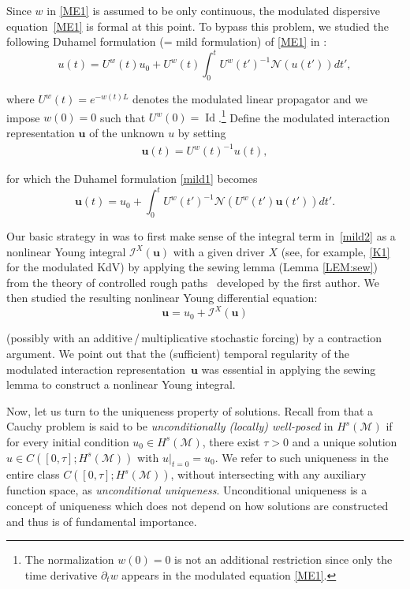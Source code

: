 \documentclass[letterpaper, 11pt,  reqno]{amsart}
\DeclareMathOperator{\Id}{Id}
\newcommand{\1}{\hspace{0.5mm}\text{I}\hspace{0.5mm}}
\newcommand{\I}{\mathcal{I}}
\newcommand{\noi}{\noindent}
\newcommand{\dt}{\partial_t}
\newcommand{\M}{\mathcal{M}}
\newcommand{\NN}{\mathcal{N}}
\newcommand{\uw}{U^w}
\newcommand{\uu}{\mathbf{u}}
\numberwithin{equation}{section}
\numberwithin{theorem}{section}
\begin{document}
Since $w$ in \eqref{ME1}
is assumed to be  only continuous, 
the modulated dispersive equation~\eqref{ME1} 
is  formal at this point.
To bypass this problem, 
 we studied 
 the following 
 Duhamel formulation (= mild formulation) of \eqref{ME1}
 in \cite{CG1, CGLLO1}:
\begin{equation}
u(t) = U^w(t) u_0 +  U^w({t}) \int_0^t  U^w({t'})^{-1}\NN( u(t') ) dt', 
\label{mild1}
\end{equation}


\noi
where $U^w(t) = e^{- w(t) L }$ denotes the modulated linear propagator
and we impose $w(0) = 0$ such that  
 $U^w(0) = \Id$.\footnote{The normalization $w(0) = 0$
 is not an additional restriction since only the time derivative $\dt w$
 appears in the modulated equation \eqref{ME1}.}
Define
 the 
 modulated interaction representation
$\uu$ of the unknown $u$ by setting
\begin{align}
\uu(t)=\uw(t)^{-1}u(t), 
\label{int1} 
\end{align}

\noi
for which 
the Duhamel formulation \eqref{mild1}
becomes 
\begin{equation}
\uu(t) = u_0 + \int_0 ^t \uw(t')^{-1}\NN(\uw(t') \uu(t'))dt'.
\label{mild2}
\end{equation}

\noi
Our basic strategy 
in \cite{CGLLO1, CGLLO2}
was 
to first make sense of the integral term in~\eqref{mild2}
as a  nonlinear Young integral
$\I^X(\uu)$ with a given driver $X$
(see, for example, \eqref{K1}
for the modulated KdV)
by applying  the sewing lemma  (Lemma \ref{LEM:sew})
from 
the theory of controlled rough paths~\cite{Gub04}
developed by the first author.
We then studied 
the resulting nonlinear Young differential equation:
\begin{equation}
\uu = u_0 + \I^X(\uu)
\label{YDE0}
\end{equation}

\noi
(possibly with an additive\,/\,multiplicative stochastic forcing)
by a contraction argument. 
We point out that 
 the (sufficient) temporal regularity of
the modulated interaction representation~$\uu$
was essential 
in applying the sewing lemma 
to construct
a nonlinear Young integral.



\medskip

Now, let us turn to the uniqueness property of  solutions.
Recall 
from  \cite{KATO} 
that  a Cauchy problem is  said to be {\it unconditionally (locally) well-posed}
in $H^s(\M)$
if for every initial condition $u_0 \in H^s(\M)$,
there exist $\tau >0$ and a unique solution $u \in C([0, \tau ];H^s(\M))$
with  $u|_{t = 0} = u_0$.
We refer to such uniqueness in the entire class $C([0, \tau ];H^s(\M))$, 
without intersecting with any auxiliary function space, as {\it unconditional uniqueness}.
Unconditional uniqueness is a concept of uniqueness which does not depend
on how solutions are constructed
and thus is of fundamental importance.
\end{document}

